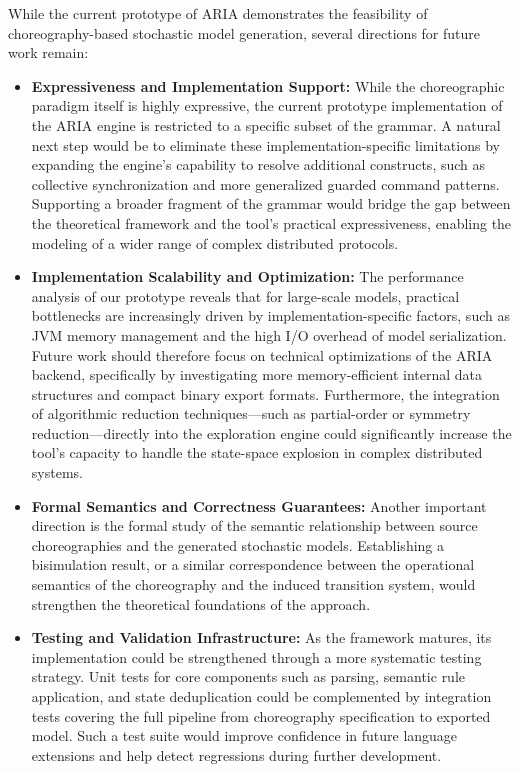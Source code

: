 While the current prototype of \textsc{ARIA} demonstrates the feasibility of choreography-based stochastic model generation, several directions for future work remain:
\begin{itemize}
	\item \textbf{Expressiveness and Implementation Support:} While the choreographic paradigm itself is highly expressive, the current prototype implementation of the \textsc{ARIA} engine is restricted to a specific subset of the grammar. A natural next step would be to eliminate these implementation-specific limitations by expanding the engine's capability to resolve additional constructs, such as collective synchronization and more generalized guarded command patterns. Supporting a broader fragment of the grammar would bridge the gap between the theoretical framework and the tool's practical expressiveness, enabling the modeling of a wider range of complex distributed protocols.
	
	\item \textbf{Implementation Scalability and Optimization:} The performance analysis of our prototype reveals that for large-scale models, practical bottlenecks are increasingly driven by implementation-specific factors, such as JVM memory management and the high I/O overhead of model serialization. Future work should therefore focus on technical optimizations of the \textsc{ARIA} backend, specifically by investigating more memory-efficient internal data structures and compact binary export formats. Furthermore, the integration of algorithmic reduction techniques---such as partial-order or symmetry reduction---directly into the exploration engine could significantly increase the tool's capacity to handle the state-space explosion in complex distributed systems.
	
	\item \textbf{Formal Semantics and Correctness Guarantees:} Another important direction is the formal study of the semantic relationship between source choreographies and the generated stochastic models. Establishing a bisimulation result, or a similar correspondence between the operational semantics of the choreography and the induced transition system, would strengthen the theoretical foundations of the approach.
	
	\item \textbf{Testing and Validation Infrastructure:} As the framework matures, its implementation could be strengthened through a more systematic testing strategy. Unit tests for core components such as parsing, semantic rule application, and state deduplication could be complemented by integration tests covering the full pipeline from choreography specification to exported model. Such a test suite would improve confidence in future language extensions and help detect regressions during further development.
\end{itemize}

